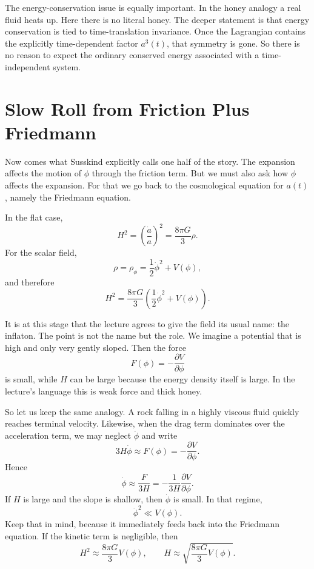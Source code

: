 The energy-conservation issue is equally important. In the honey analogy a real fluid heats up. Here there is no literal honey. The deeper statement is that energy conservation is tied to time-translation invariance. Once the Lagrangian contains the explicitly time-dependent factor \(a^{3}(t)\), that symmetry is gone. So there is no reason to expect the ordinary conserved energy associated with a time-independent system.

\section{Slow Roll from Friction Plus Friedmann}

Now comes what Susskind explicitly calls one half of the story. The expansion affects the motion of \(\phi\) through the friction term. But we must also ask how \(\phi\) affects the expansion. For that we go back to the cosmological equation for \(a(t)\), namely the Friedmann equation.

In the flat case,
\begin{equation}
H^{2}=\left(\frac{\dot a}{a}\right)^{2}=\frac{8\pi G}{3}\rho.
\end{equation}
For the scalar field,
\begin{equation}
\rho=\rho_\phi=\frac{1}{2}\dot{\phi}^{2}+V(\phi),
\end{equation}
and therefore
\begin{equation}
H^{2}=\frac{8\pi G}{3}\left(\frac{1}{2}\dot{\phi}^{2}+V(\phi)\right).
\end{equation}

It is at this stage that the lecture agrees to give the field its usual name: the inflaton. The point is not the name but the role. We imagine a potential that is high and only very gently sloped. Then the force
\[
F(\phi)=-\frac{\partial V}{\partial\phi}
\]
is small, while \(H\) can be large because the energy density itself is large. In the lecture's language this is weak force and thick honey.

So let us keep the same analogy. A rock falling in a highly viscous fluid quickly reaches terminal velocity. Likewise, when the drag term dominates over the acceleration term, we may neglect \(\ddot\phi\) and write
\begin{equation}
3H\dot\phi \approx F(\phi)=-\frac{\partial V}{\partial\phi}.
\end{equation}
Hence
\begin{equation}
\dot\phi \approx \frac{F}{3H}=-\frac{1}{3H}\frac{\partial V}{\partial\phi}.
\end{equation}
If \(H\) is large and the slope is shallow, then \(\dot\phi\) is small. In that regime,
\[
\dot\phi^{2}\ll V(\phi).
\]
Keep that in mind, because it immediately feeds back into the Friedmann equation. If the kinetic term is negligible, then
\begin{equation}
H^{2}\approx \frac{8\pi G}{3}V(\phi),
\qquad
H\approx \sqrt{\frac{8\pi G}{3}V(\phi)}.
\end{equation}

